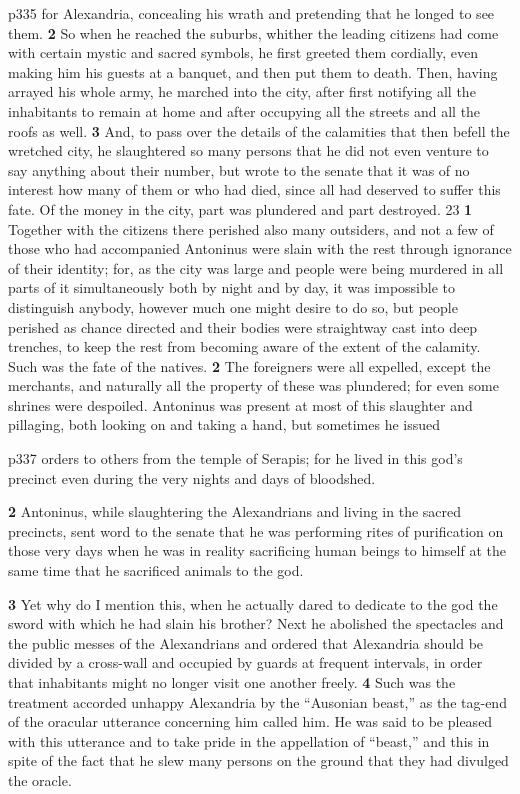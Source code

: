 p335 for Alexandria, concealing his wrath and pretending that he longed to see them. \textbf{2} So when he reached the suburbs, whither the leading citizens had come with certain mystic and sacred symbols, he first greeted them cordially, even making him his guests at a banquet, and then put them to death. Then, having arrayed his whole army, he marched into the city, after first notifying all the inhabitants to remain at home and after occupying all the streets and all the roofs as well. \textbf{3} And, to pass over the details of the calamities that then befell the wretched city, he slaughtered so many persons that he did not even venture to say anything about their number, but wrote to the senate that it was of no interest how many of them or who had died, since all had deserved to suffer this fate. Of the money in the city, part was plundered and part destroyed.
23
\textbf{1} Together with the citizens there perished also many outsiders, and not a few of those who had accompanied Antoninus were slain with the rest through ignorance of their identity; for, as the city was large and people were being murdered in all parts of it simultaneously both by night and by day, it was impossible to distinguish anybody, however much one might desire to do so, but people perished as chance directed and their bodies were straightway cast into deep trenches, to keep the rest from becoming aware of the extent of the calamity. Such was the fate of the natives. \textbf{2} The foreigners were all expelled, except the merchants, and naturally all the property of these was plundered; for even some shrines were despoiled. Antoninus was present at most of this slaughter and pillaging, both looking on and taking a hand, but sometimes he issued

p337 orders to others from the temple of Serapis; for he lived in this god's precinct even during the very nights and days of bloodshed.

\textbf{2} Antoninus, while slaughtering the Alexandrians and living in the sacred precincts, sent word to the senate that he was performing rites of purification on those very days when he was in reality sacrifi­cing human beings to himself at the same time that he sacrificed animals to the god.

\textbf{3} Yet why do I mention this, when he actually dared to dedicate to the god the sword with which he had slain his brother? Next he abolished the spectacles and the public messes of the Alexandrians and ordered that Alexandria should be divided by a cross-wall and occupied by guards at frequent intervals, in order that inhabitants might no longer visit one another freely. \textbf{4} Such was the treatment accorded unhappy Alexandria by the ``Ausonian beast,'' as the tag-end of the oracular utterance concerning him called him. He was said to be pleased with this utterance and to take pride in the appellation of ``beast,'' and this in spite of the fact that he slew many persons on the ground that they had divulged the oracle.

